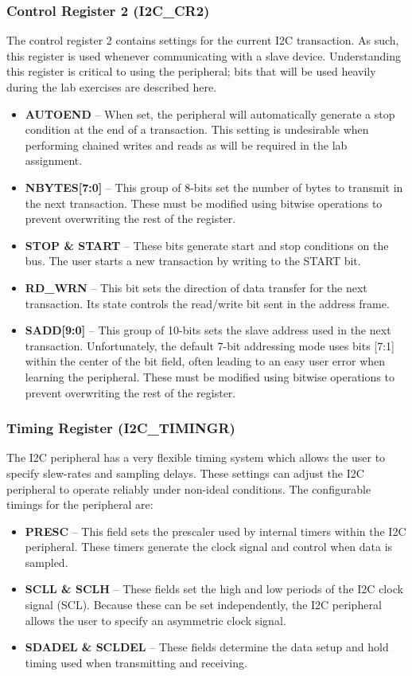 \documentclass[11pt,fleqn]{book} %
\begin{document}
    \subsubsection{Control Register 2 (I2C\_CR2)}
    The control register 2 contains settings for the current I2C transaction. As such, this register is used whenever communicating with a slave device. Understanding this register is critical to using the peripheral; bits that will be used heavily during the lab exercises are described here. 
    \begin{itemize}
        \item \textbf{AUTOEND} -- When set, the peripheral will automatically generate a stop condition at the end of a transaction. This setting is undesirable when performing chained writes and reads as will be required in the lab assignment. 
        \item \textbf{NBYTES[7:0]} -- This group of 8-bits set the number of bytes to transmit in the next transaction. These must be modified using bitwise operations to prevent overwriting the rest of the register. 
        \item \textbf{STOP \& START} -- These bits generate start and stop conditions on the bus. The user starts a new transaction by writing to the START bit.
        \item \textbf{RD\_WRN} -- This bit sets the direction of data transfer for the next transaction. Its state controls the read/write bit sent in the address frame. 
        \item \textbf{SADD[9:0]} -- This group of 10-bits sets the slave address used in the next transaction. Unfortunately, the default 7-bit addressing mode uses bits [7:1] within the center of the bit field, often leading to an easy user error when learning the peripheral. These must be modified using bitwise operations to prevent overwriting the rest of the register.  
    \end{itemize}
    
    
    \subsubsection{Timing Register (I2C\_TIMINGR)}
    The I2C peripheral has a very flexible timing system which allows the user to specify slew-rates and sampling delays. These settings can adjust the I2C peripheral to operate reliably under non-ideal conditions. The configurable timings for the peripheral are:
    
    \begin{itemize}
        \item \textbf{PRESC} -- This field sets the prescaler used by internal timers within the I2C peripheral. These timers generate the clock signal and control when data is sampled.  
        \item \textbf{SCLL \& SCLH} -- These fields set the high and low periods of the I2C clock signal (SCL). Because these can be set independently, the I2C peripheral allows the user to specify an asymmetric clock signal. 
        \item \textbf{SDADEL \& SCLDEL} -- These fields determine the data setup and hold timing used when transmitting and receiving. 
    \end{itemize}
\end{document}
